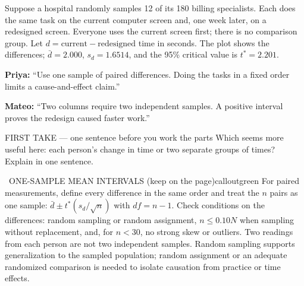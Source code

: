 \documentclass[11pt]{article}
\begin{document}
Suppose a hospital randomly samples 12 of its 180 billing specialists. Each does the same task on the current computer screen and, one week later, on a redesigned screen. Everyone uses the current screen first; there is no comparison group. Let $d=\text{current}-\text{redesigned}$ time in seconds. The plot shows the differences; $\bar d=2.000$, $s_d=1.6514$, and the 95\% critical value is $t^*=2.201$.\par\smallskip \textbf{Priya:} ``Use one sample of paired differences. Doing the tasks in a fixed order limits a cause-and-effect claim.''\par \textbf{Mateo:} ``Two columns require two independent samples. A positive interval proves the redesign caused faster work.''\par
\begin{center}
\end{center}
\begin{firsttakebox}{FIRST TAKE --- one sentence before you work the parts}
Which seems more useful here: each person's change in time or two separate groups of times? Explain in one sentence.\par
{}
\end{firsttakebox}

\begin{callout}{\IconBook\ ONE-SAMPLE MEAN INTERVALS (keep on the page)}{calloutgreen}
For paired measurements, define every difference in the same order and treat the $n$ pairs as
one sample: $\bar d\pm t^*(s_d/\sqrt n)$ with $df=n-1$. Check conditions on the differences:
random sampling or random assignment, $n\leq0.10N$ when sampling without replacement, and,
for $n<30$, no strong skew or outliers. Two readings from each person are not two independent
samples. Random sampling supports generalization to the sampled population; random assignment
or an adequate randomized comparison is needed to isolate causation from practice or time effects.
\end{callout}
\end{document}
